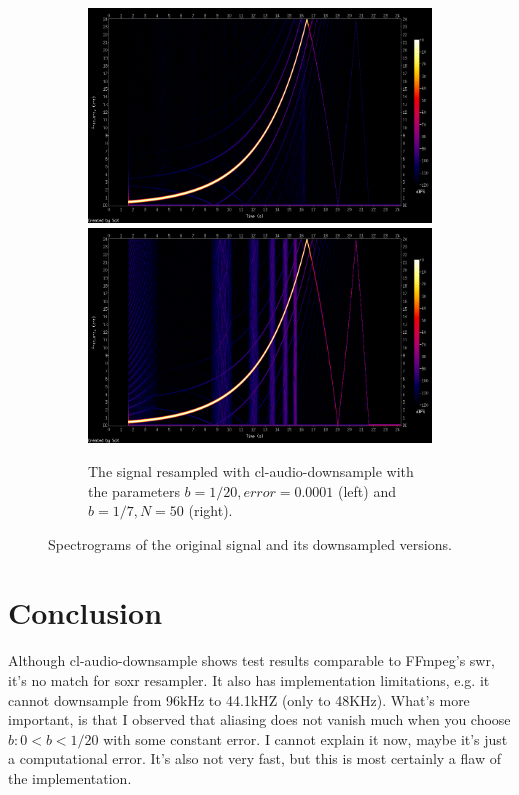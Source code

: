 \documentclass[a4paper,11pt,fleqn]{article}
\begin{document}
\begin{figure}[h!]
  \begin{subfigure}{\linewidth}
  \includegraphics[width=.4\linewidth]{accurate.png}\hfill
  \includegraphics[width=.4\linewidth]{fast.png}\hfill
  \caption{The signal resampled with cl-audio-downsample with the parameters $b=1/20, error=0.0001$ (left) and $b=1/7, N=50$ (right).}
  \end{subfigure}\par\medskip
  \caption{Spectrograms of the original signal and its downsampled versions.}
  \label{spectro}
\end{figure}

\section{Conclusion}
Although cl-audio-downsample shows test results comparable to FFmpeg's swr, it's no match for soxr resampler. It also has implementation limitations, e.g. it cannot downsample from 96kHz to 44.1kHZ (only to 48KHz). What's more
important, is that I observed that aliasing does not vanish much when you choose $b: 0 < b < 1/20$ with some constant error. I cannot explain it now, maybe it's just a computational error. It's also not very fast, but this is
most certainly a flaw of the implementation.
\end{document}
